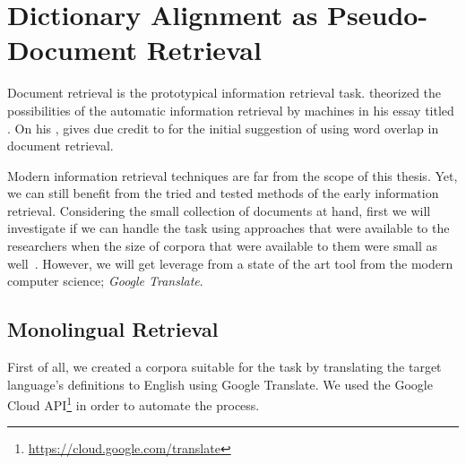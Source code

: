 
\chapter{Dictionary Alignment as Pseudo-Document Retrieval}%
\label{chap:retrieval}

Document retrieval is the prototypical information retrieval task.
\textcite{bush_as_1945} theorized the possibilities of the automatic information retrieval by machines in his essay titled .
On his , \textcite{singhal_modern_2001} gives due credit to \textcite{luhn_statistical_1957} for the initial suggestion of using word overlap in document retrieval.

Modern information retrieval techniques are far from the scope of this thesis.
Yet, we can still benefit from the tried and tested methods of the early information retrieval.
Considering the small collection of documents at hand, first we will investigate if we can handle the task using approaches that were available to the researchers when the size of corpora that were available to them were small as well~\cite{singhal_modern_2001}.
However, we will get leverage from a state of the art tool from the modern computer science; \emph{Google Translate}.

\section{Monolingual Retrieval}

First of all, we created a corpora suitable for the task by translating the target language's definitions to English using Google Translate.
We used the Google Cloud API\footnote{\url{https://cloud.google.com/translate}} in order to automate the process.

